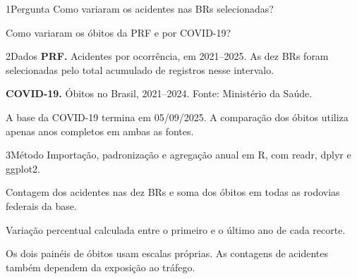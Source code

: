 \documentclass{rbras-poster}
\begin{document}
\begin{colunaesquerda}
\begin{secao}{1}{Pergunta}
Como variaram os acidentes nas BRs selecionadas?
\par\vspace{12bp}
Como variaram os óbitos da PRF e por COVID-19?
\end{secao}
\begin{secao}{2}{Dados}
\textbf{PRF.} Acidentes por ocorrência, em 2021–2025. As dez BRs foram selecionadas pelo total acumulado de registros nesse intervalo.
\par\vspace{24bp}
\textbf{COVID-19.} Óbitos no Brasil, 2021–2024. Fonte: Ministério da Saúde.
\par\vspace{24bp}
A base da COVID-19 termina em 05/09/2025. A comparação dos óbitos utiliza apenas anos completos em ambas as fontes.
\end{secao}
\begin{secao}{3}{Método}
Importação, padronização e agregação anual em R, com readr, dplyr e ggplot2.
\par\vspace{24bp}
Contagem dos acidentes nas dez BRs e soma dos óbitos em todas as rodovias federais da base.
\par\vspace{24bp}
Variação percentual calculada entre o primeiro e o último ano de cada recorte.
\par\vspace{24bp}
Os dois painéis de óbitos usam escalas próprias. As contagens de acidentes também dependem da exposição ao tráfego.
\end{secao}
\end{colunaesquerda}
\end{document}
